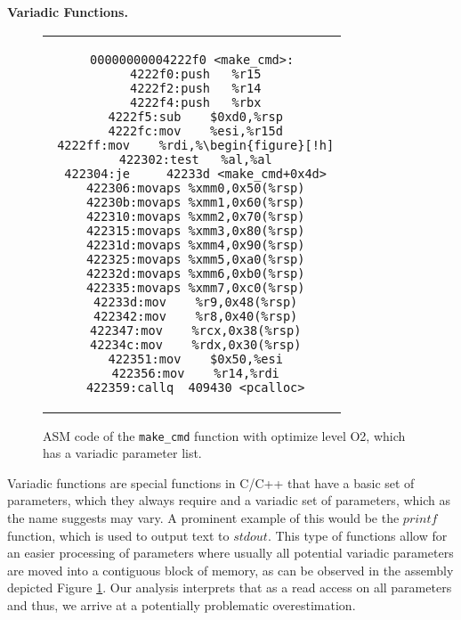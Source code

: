 \textbf{Variadic Functions.}
\label{subsection:variadicfunctions}

\begin{figure}[thp] %
\centering          %
\begin{tabular}{c}  %
\footnotesize
\begin{lstlisting}
00000000004222f0 <make_cmd>:
 4222f0:push   %r15
 4222f2:push   %r14
 4222f4:push   %rbx
 4222f5:sub    $0xd0,%rsp
 4222fc:mov    %esi,%r15d
 4222ff:mov    %rdi,%\begin{figure}[!h]
 422302:test   %al,%al
 422304:je     42233d <make_cmd+0x4d>
 422306:movaps %xmm0,0x50(%rsp)
 42230b:movaps %xmm1,0x60(%rsp)
 422310:movaps %xmm2,0x70(%rsp)
 422315:movaps %xmm3,0x80(%rsp)
 42231d:movaps %xmm4,0x90(%rsp)
 422325:movaps %xmm5,0xa0(%rsp)
 42232d:movaps %xmm6,0xb0(%rsp)
 422335:movaps %xmm7,0xc0(%rsp)
 42233d:mov    %r9,0x48(%rsp)
 422342:mov    %r8,0x40(%rsp)
 422347:mov    %rcx,0x38(%rsp)
 42234c:mov    %rdx,0x30(%rsp)
 422351:mov    $0x50,%esi
 422356:mov    %r14,%rdi
 422359:callq  409430 <pcalloc>
\end{lstlisting}
\end{tabular}
\caption{ASM code of the \texttt{make\_cmd} function with optimize level O2, which has a variadic parameter list.}
\label{fig:asmvariadic}
\end{figure}

Variadic functions are special functions in C/C++ that have a basic set of parameters, 
which they always require and a variadic set of parameters, which as the name suggests 
may vary. A prominent example of this would be the $printf$ function, which is used 
to output text to $stdout$.
This type of functions allow for an easier processing of parameters where
usually all potential variadic parameters are moved into a contiguous block of memory, 
as can be observed in the assembly depicted Figure \ref{fig:asmvariadic}.
Our analysis interprets that as a read access on all parameters and thus,
we arrive at a potentially problematic overestimation. 

